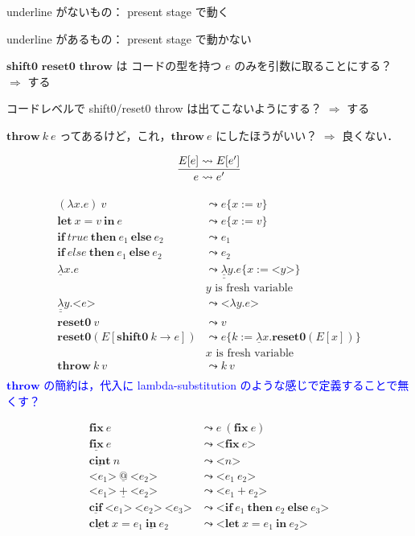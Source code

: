 \documentclass[10pt,a4j]{jarticle}
\makeatletter
\newcommand\blue[1]{\textcolor{blue}{#1}}
\newcommand\fun[2]{\lambda{#1}.{#2}}
\newcommand\Resetz{\textbf{reset0}}
\newcommand\Shiftz{\textbf{shift0}}
\newcommand\Throw{\textbf{throw}}
\newcommand\cfun[2]{\underline{\lambda}{#1}.{#2}}
\newcommand\ccfun[2]{\underline{\underline{\lambda}}{#1}.{#2}}
\newcommand\cResetz{\underline{\textbf{reset0}}}
\newcommand\cShiftz{\underline{\textbf{shift0}}}
\newcommand\cThrow{\underline{\textbf{throw}}}
\newcommand\cPlus{\underline{\textbf{+}}}
\newcommand\cLet{\underline{\textbf{clet}}}
\newcommand\cIn{\underline{\textbf{in}}}
\newcommand\clet[3]{\cLet~{#1}={#2}~\cIn~{#3}}
\newcommand\cint{\underline{\textbf{cint}}}
\newcommand\code[1]{\texttt{<}{#1}\texttt{>}}
\newcommand\Let{\textbf{let}}
\newcommand\In{\textbf{in}}
\newcommand\letin[3]{\Let~{#1}={#2}~\In~{#3}}
\newcommand\ift[3]{\textbf{if}~{#1}~\textbf{then}~{#2}~\textbf{else}~{#3}}
\newcommand\cif[3]{\underline{\textbf{cif}}~\code{{#1}}~\code{{#2}}~\code{{#3}}}
\newcommand\fix{\textbf{fix}}
\newcommand\cfix{\underline{\textbf{fix}}}
\newcommand\lto{\leadsto}
\newcommand\cat{\underline{@}}
\newcommand\ooi[1]{\blue{{#1}}}
\theoremstyle{break}
\makeatother
\begin{document}
underline がないもの： present stage で動く

underline があるもの： present stage で動かない

$\Shiftz$ $\Resetz$ $\Throw$ は コードの型を持つ $e$ のみを引数に取ることにする？ $\Rightarrow$ する

コードレベルで shift0/reset0 throw は出てこないようにする？ $\Rightarrow$ する

$\Throw~ k~ e$ ってあるけど，これ，$\Throw~ e$ にしたほうがいい？ $\Rightarrow$ 良くない．

\begin{align*}
  &\infer{e \lto e'}
    {E[e] \lto E[e']} \\
\end{align*}

\begin{align*}
  (\fun{x}{e})~v &\lto e\{ x := v \} \\
  \letin{x}{v}{e} &\lto e\{ x := v \}\\
  \ift{true}{e_1}{e_2} &\lto e_1 \\
  \ift{else}{e_1}{e_2} &\lto e_2 \\
  \cfun{x}{e} &\lto \ccfun{y}{e\{ x := \code{y} \}} \\
  &y \text{ is fresh variable} \\
  \ccfun{y}{\code{e}} &\lto \code{\fun{y}{e}} \\
  \Resetz~ v &\lto v \\
  \Resetz (E[\Shiftz~ k \to e]) &\lto e \{k := \cfun{x}{\Resetz (E[x])} \} \\
  &x \text{ is fresh variable} \\
  \Throw~ k~ v &\lto k~ v \\
\end{align*}
\ooi{$\Throw$ の簡約は，代入に lambda-substitution のような感じで定義することで無くす？}

\begin{align*}
  \fix~ e &\lto e~ (\fix~ e) \\
  \cfix~ e &\lto \code{\fix~ e} \\
  \cint~ n &\lto \code{n} \\
  \code{e_1}~ \cat~ \code{e_2} &\lto \code{e_1~ e_2} \\
  \code{e_1}~ \cPlus~ \code{e_2} &\lto \code{e_1 + e_2} \\
  \cif{e_1}{e_2}{e_3} &\lto \code{\ift{e_1}{e_2}{e_3}} \\
  \clet{x}{e_1}{e_2} &\lto \code{\letin{x}{e_1}{e_2}} \\
\end{align*}
\end{document}
